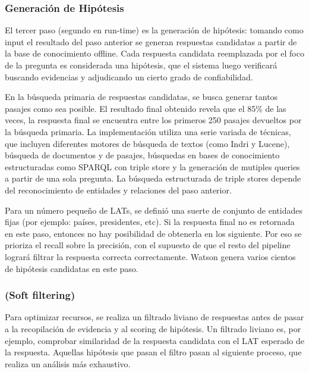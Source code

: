 \subsubsection{Generaci\'on de Hip\'otesis}

El tercer paso (segundo en run-time) es la generaci\'on de hip\'otesis:
tomando como input el resultado del paso anterior se generan respuestas
candidatas a partir de la base de conocimiento offline. Cada respuesta
candidata reemplazada por el foco de la pregunta es considerada una
hip\'otesis, que el sistema luego verificar\'a buscando evidencias y
adjudicando un cierto grado de confiabilidad.

En la b\'usqueda primaria de respuestas candidatas, se busca generar
tantos pasajes como sea posible. El resultado final obtenido revela que
el 85\% de las veces, la respuesta final se encuentra entre los
primeros 250 pasajes devueltos por la b\'usqueda primaria. La
implementaci\'on utiliza una serie variada de t\'ecnicas, que incluyen
diferentes motores de b\'usqueda de textos (como Indri y Lucene),
b\'usqueda de documentos y de pasajes, b\'usquedas en bases de
conocimiento estructuradas como SPARQL con triple store y la
generaci\'on de mutiples queries a partir de una sola pregunta. La
b\'usqueda estructurada de triple stores depende del reconocimiento de
entidades y relaciones del paso anterior.

Para un n\'umero peque\~no de LATs, se defini\'o una suerte de conjunto
de entidades fijas (por ejemplo: pa\'ises, presidentes, etc). Si la
respuesta final no es retornada en este paso, entonces no hay
posibilidad de obtenerla en los siguiente. Por eso se prioriza el
recall sobre la precisi\'on, con el supuesto de que el resto del
pipeline lograr\'a filtrar la respuesta correcta correctamente. Watson
genera varios cientos de hip\'otesis candidatas en este paso.


\bigskip

\subsubsection{(Soft filtering)}

Para optimizar recursos, se realiza un filtrado liviano de respuestas
antes de pasar a la recopilaci\'on de evidencia y al scoring de
hip\'otesis. Un filtrado liviano es, por ejemplo, comprobar similaridad
de la respuesta candidata con el LAT esperado de la respuesta. Aquellas
hip\'otesis que pasan el filtro pasan al siguiente proceso, que realiza
un an\'alisis m\'as exhaustivo.


